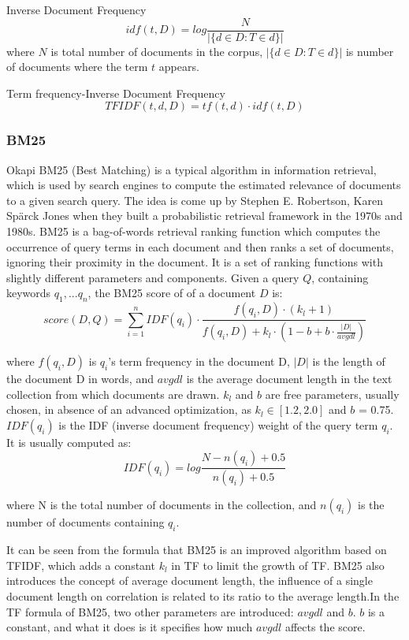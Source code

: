 \documentclass[10pt,a4paper,fleqn]{report}
\begin{document}
				Inverse Document Frequency
				$$ idf(t,D) = log \frac{N}{|\{d \in D:T \in d\}|} $$
				where $N$ is total number of documents in the corpus, $|\{d \in D:T \in d\}|$ is number of documents where the term $t$ appears.
					
				Term frequency-Inverse Document Frequency
				$$TFIDF(t,d,D) = tf(t,d) \cdot idf(t,D)$$	

			\subsubsection{BM25}
			
				Okapi BM25 (Best Matching) is a typical algorithm in information retrieval, which is used by search engines to compute the estimated relevance of documents to a given search query. The idea is come up by Stephen E. Robertson, Karen Spärck Jones when they built a probabilistic retrieval framework in the 1970s and 1980s.
				BM25 is a bag-of-words retrieval ranking function which computes the occurrence of query terms in each document and then ranks a set of documents, ignoring their proximity in the document. It is a set of ranking functions with slightly different parameters and components. 
				Given a query $Q$, containing keywords $q_1,...q_n$, the BM25 score of of a document $D$ is:
				$$ score(D,Q) = \sum_{i=1}^{n} IDF(q_i)\cdot \frac{f(q_i,D)\cdot (k_l+1)}{f(q_i,D)+k_l \cdot (1-b+b \cdot \frac{|D|}{avgdl})}$$
				
				where $f(q_i,D)$ is $q_i$'s term frequency in the document D, $|D|$ is the length of the document D in words, and $avgdl$ is the average document length in the text collection from which documents are drawn. $k_l$ and $b$ are free parameters, usually chosen, in absence of an advanced optimization, as $k_l\in [1.2,2.0]$ and $b$ = 0.75. $IDF(q_i)$ is the IDF (inverse document frequency) weight of the query term $q_i$. It is usually computed as:
				$$IDF(q_i)=log \frac{N-n(q_i)+0.5}{n(q_i)+0.5}$$
				
				where N is the total number of documents in the collection, and $n(q_i)$ is the number of documents containing $q_i$.
				
				It can be seen from the formula that BM25 is an improved algorithm based on TFIDF, which adds a constant $k_l$ in TF to limit the growth of TF. BM25 also introduces the concept of average document length, the influence of a single document length on correlation is related to its ratio to the average length.In the TF formula of BM25, two other parameters are introduced: $avgdl$ and $b$. $b$ is a constant, and what it does is it specifies how much $avgdl$ affects the score.
				
\end{document}
